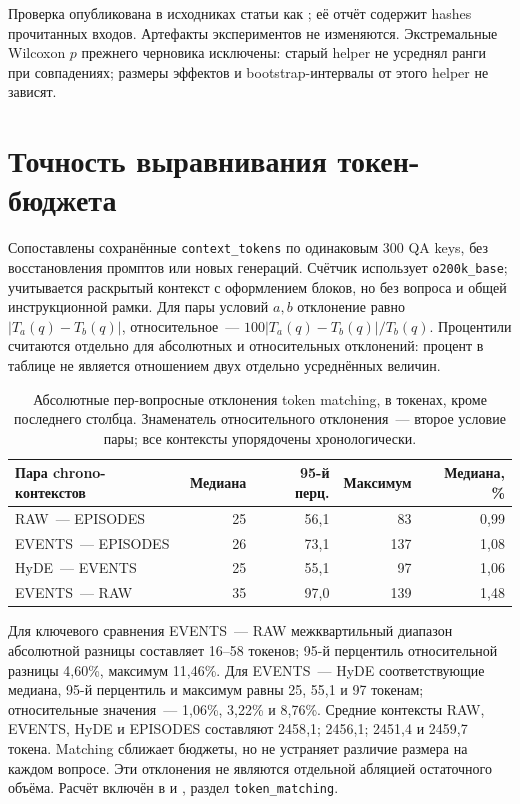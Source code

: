 \documentclass[11pt,a4paper]{article}
\begin{document}
Проверка опубликована в исходниках статьи как
; её отчёт 
содержит hashes прочитанных входов. Артефакты экспериментов не изменяются.
Экстремальные Wilcoxon $p$ прежнего черновика исключены: старый helper
не усреднял ранги при совпадениях; размеры эффектов и bootstrap-интервалы
от этого helper не зависят.

\section{Точность выравнивания токен-бюджета}
\label{app:tokens}

Сопоставлены сохранённые \texttt{context\_tokens} по одинаковым 300 QA keys,
без восстановления промптов или новых генераций. Счётчик использует
\texttt{o200k\_base}; учитывается раскрытый контекст с оформлением блоков,
но без вопроса и общей инструкционной рамки. Для пары условий $a,b$
отклонение равно $|T_a(q)-T_b(q)|$, относительное~---
$100|T_a(q)-T_b(q)|/T_b(q)$. Процентили считаются отдельно для абсолютных
и относительных отклонений: процент в таблице не является отношением
двух отдельно усреднённых величин.

\begin{table}[ht]
\centering\small
\begin{tabular}{lrrrr}
\toprule
Пара chrono-контекстов & Медиана & 95-й перц. & Максимум & Медиана, \%\\
\midrule
RAW~--- EPISODES & 25 & 56{,}1 & 83 & 0{,}99\\
EVENTS~--- EPISODES & 26 & 73{,}1 & 137 & 1{,}08\\
HyDE~--- EVENTS & 25 & 55{,}1 & 97 & 1{,}06\\
EVENTS~--- RAW & 35 & 97{,}0 & 139 & 1{,}48\\
\bottomrule
\end{tabular}
\caption{Абсолютные пер-вопросные отклонения token matching, в токенах,
кроме последнего столбца. Знаменатель относительного отклонения~---
второе условие пары; все контексты упорядочены хронологически.}
\end{table}

Для ключевого сравнения EVENTS~--- RAW межквартильный диапазон абсолютной
разницы составляет 16--58 токенов; 95-й перцентиль относительной разницы
4{,}60\%, максимум 11{,}46\%. Для EVENTS~--- HyDE соответствующие медиана,
95-й перцентиль и максимум равны 25, 55{,}1 и 97 токенам; относительные
значения~--- 1{,}06\%, 3{,}22\% и 8{,}76\%. Средние контексты RAW, EVENTS,
HyDE и EPISODES составляют 2458{,}1; 2456{,}1; 2451{,}4 и 2459{,}7 токена.
Matching сближает бюджеты, но не устраняет различие размера на каждом
вопросе. Эти отклонения не являются отдельной абляцией остаточного объёма.
Расчёт включён в  и
, раздел \texttt{token\_matching}.
\end{document}
